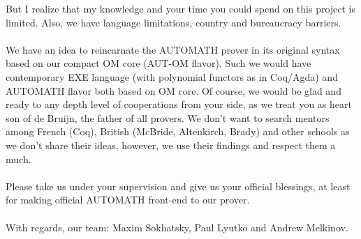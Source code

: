 \documentclass[10pt]{article}
\begin{document}
But I realize that my knowledge and your time you could spend on this project is limited.
Also, we have language limitations, country and bureaucracy barriers.\\
\\
We have an idea to reincarnate the AUTOMATH prover in its original syntax 
based on our compact OM core (AUT-OM flavor).
Such we would have contemporary EXE language (with polynomial functors as in Coq/Agda) 
and AUTOMATH flavor both based on OM core.
Of course, we would be glad and ready to any depth level of cooperations from your side, 
as we treat you as heart son of de Bruijn, the father of all provers.
We don't want to search mentors among French (Coq), British (McBride, Altenkirch, Brady) 
and other schools as we don't share their ideas,  however, we use their findings and respect them a much.\\
\\
Please take us under your supervision and give us your official blessings,
at least for making official AUTOMATH front-end to our prover.\\
\\
With regards, our team: Maxim Sokhatsky, Paul Lyutko and Andrew Melkinov.
\end{document}
